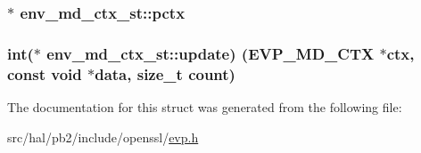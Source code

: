 \subsubsection[{\texorpdfstring{pctx}{pctx}}]{$\ast$ env\+\_\+md\+\_\+ctx\+\_\+st\+::pctx}\hypertarget{structenv__md__ctx__st_aaf0d8bf6f34617159fd263074a07a555}{}\label{structenv__md__ctx__st_aaf0d8bf6f34617159fd263074a07a555}
\subsubsection[{\texorpdfstring{update}{update}}]{\setlength{\rightskip}{0pt plus 5cm}int($\ast$ env\+\_\+md\+\_\+ctx\+\_\+st\+::update) ({\bf E\+V\+P\+\_\+\+M\+D\+\_\+\+C\+TX} $\ast$ctx, const void $\ast$data, size\+\_\+t count)}\hypertarget{structenv__md__ctx__st_a55517be3f51260fe504e146b9b651d60}{}\label{structenv__md__ctx__st_a55517be3f51260fe504e146b9b651d60}


The documentation for this struct was generated from the following file\+:\begin{DoxyCompactItemize}
\item 
src/hal/pb2/include/openssl/\hyperlink{evp_8h}{evp.\+h}\end{DoxyCompactItemize}

